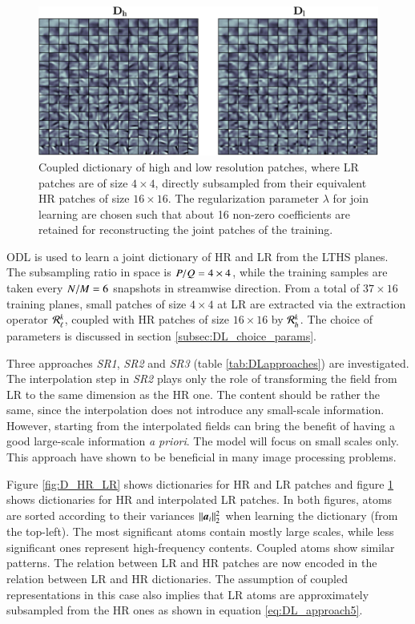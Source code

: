\begin{figure}[t]
\centering
	\includegraphics[width=\textwidth]{./images/DL/SR_sspacing04/subsampling/coupleddictionary_HRHRinterp_lambda010.eps}
	\caption{\label{fig:D_HR_HRinterp} Coupled dictionary of high and low resolution patches, where LR patches are of size $ 4\times 4 $, directly subsampled from their equivalent HR patches of size $ 16 \times 16 $. The regularization parameter $ \lambda $ for join learning are chosen such that about 16 non-zero coefficients are retained for reconstructing the joint patches of the training.}
\end{figure}

ODL \citep{mairal2010online} is used to learn a joint dictionary of HR and LR from the LTHS planes. The subsampling ratio in space is $ P/Q = 4 \times 4 $, while the training samples are taken every $ N/M = 6 $ snapshots in streamwise direction. From a total of $ 37 \times 16 $ training planes, small patches of size $ 4 \times 4 $ at LR are extracted via the extraction operator $ \operatorname{\mathcal{R}_{\ell}^{\mathit{k}}} $, coupled with HR patches of size $ 16 \times 16 $ by $ \operatorname{\mathit{\mathcal{R}_h^{k}}} $. The choice of parameters is discussed in section \ref{subsec:DL_choice_params}.

Three approaches \textit{SR1}, \textit{SR2} and \textit{SR3} (table \ref{tab:DLapproaches}) are investigated. The interpolation step in \textit{SR2} plays only the role of transforming the field from LR to the same dimension as the HR one. The content should be rather the same, since the interpolation does not introduce any small-scale information. However, starting from the interpolated fields can bring the benefit of having a good large-scale information \textit{a priori}. The model will focus on small scales only. This approach have shown to be beneficial in many image processing problems.

Figure \ref{fig:D_HR_LR} shows dictionaries for HR and LR patches and figure \ref{fig:D_HR_HRinterp} shows dictionaries for HR and interpolated LR patches. In both figures, atoms are sorted according to their variances $ \operatorname{\Arrowvert \mathit{\boldsymbol{a}_i} \Arrowvert^2_2 } $ when learning the dictionary (from the top-left). The most significant atoms contain mostly large scales, while less significant ones represent high-frequency contents. Coupled atoms show similar patterns. The relation between LR and HR patches are now encoded in the relation between LR and HR dictionaries. The assumption of coupled representations in this case also implies that LR atoms are approximately subsampled from the HR ones as shown in equation \ref{eq:DL_approach5}. 

